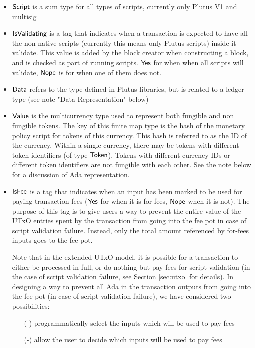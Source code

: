 \begin{itemize}
  \item $\mathsf{Script}$ is a sum type for all types of scripts, currently only
  Plutus V1 and multisig

  \item $\mathsf{IsValidating}$ is a tag that indicates when a transaction is
  expected to have all the non-native scripts (currently this means only
  Plutus scripts) inside it validate.
  This value is added by the block creator when
  constructing a block, and is checked as part of running scripts.
  $\mathsf{Yes}$ for when when all scripts will validate,
  $\mathsf{Nope}$ is for when one of them does not.

  \item $\mathsf{Data}$ refers to the type defined in Plutus libraries, but is
  related to a ledger type (see note "Data Representation" below)

  \item $\mathsf{Value}$ is the multicurrency type used to represent
  both fungible and non fungible tokens. The key of this finite map type is
  the hash of the monetary policy script for tokens of this currency.
  This hash is referred to as the ID of the currency. Within a single
  currency, there may be tokens with different token identifiers
  (of type $\mathsf{Token}$). Tokens with different currency IDs
  or different token identifiers are not fungible with each other.
  See the note below for a discussion of Ada representation.

  \item $\mathsf{IsFee}$ is a tag that indicates when an input has been marked
  to be used for paying transaction fees ($\mathsf{Yes}$ for when it is for fees,
  $\mathsf{Nope}$ when it is not). The purpose of this tag is to give users a way to prevent
  the entire value of the UTxO entries spent by the transaction
  from going into the fee pot in case of script validation failure.
  Instead, only the total amount referenced by for-fees inputs goes
  to the fee pot.

  Note that in the extended UTxO model, it is possible for a transaction
  to either be processed in full, or do nothing but pay fees for script
  validation (in the case of script validation failure, see Section
  \ref{sec:utxo} for details).
  In designing a way to prevent all Ada in the transaction outputs from going into
  the fee pot (in case of script validation failure), we have considered two
  possibilities:

  \begin{itemize}
    \item[(-)] programmatically select the inputs which will be used to pay fees
    \item[(-)] allow the user to decide which inputs will be used to pay fees
  \end{itemize}


\end{itemize}
